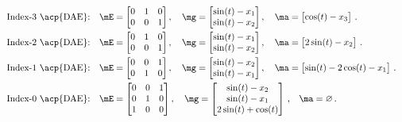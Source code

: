 \begin{equation*}
  \begin{array}{l}
    \text{Index-3 \acp{DAE}:} \quad \mE = \begin{bmatrix}
      0 & 1 & 0 \\
      0 & 0 & 1
    \end{bmatrix}, \quad
    \mg = \begin{bmatrix}
      \sin(t) - x_{1} \\
      \sin(t) - x_{2}
    \end{bmatrix}, \quad
    \ma = \begin{bmatrix}
      \cos(t) - x_{3}
    \end{bmatrix} \, \text{.} \\[1.0em]
    \text{Index-2 \acp{DAE}:} \quad \mE = \begin{bmatrix}
      0 & 1 & 0 \\
      0 & 0 & 1
    \end{bmatrix}, \quad
    \mg = \begin{bmatrix}
      \sin(t) - x_{1} \\
      \sin(t) - x_{2}
    \end{bmatrix}, \quad
    \ma = \begin{bmatrix}
      2\sin(t) - x_{2}
    \end{bmatrix} \, \text{.} \\[1.0em]
    \text{Index-1 \acp{DAE}:} \quad \mE = \begin{bmatrix}
      0 & 0 & 1 \\
      0 & 1 & 0
    \end{bmatrix}, \quad
    \mg = \begin{bmatrix}
      \sin(t) - x_{2} \\
      \sin(t) - x_{1}
    \end{bmatrix}, \quad
    \ma = \begin{bmatrix}
      \sin(t) - 2\cos(t) - x_{1}
    \end{bmatrix} \, \text{.} \\[1.0em]
    \text{Index-0 \acp{DAE}:} \quad \mE = \begin{bmatrix}
      0 & 0 & 1 \\
      0 & 1 & 0 \\
      1 & 0 & 0
    \end{bmatrix}, \quad
    \mg = \begin{bmatrix}
      \sin(t) - x_{2} \\
      \sin(t) - x_{1} \\
      2\sin(t) + \cos(t)
    \end{bmatrix} \, \text{,} \quad
    \ma = \varnothing \, \text{.}
  \end{array}
\end{equation*}
